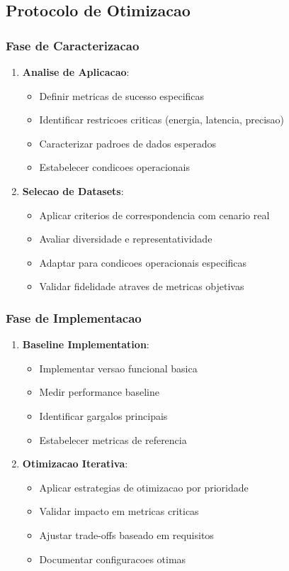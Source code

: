 \subsection{Protocolo de Otimizacao}

\subsubsection{Fase de Caracterizacao}
\begin{enumerate}
    \item \textbf{Analise de Aplicacao}:
    \begin{itemize}
        \item Definir metricas de sucesso especificas
        \item Identificar restricoes criticas (energia, latencia, precisao)
        \item Caracterizar padroes de dados esperados
        \item Estabelecer condicoes operacionais
    \end{itemize}
    
    \item \textbf{Selecao de Datasets}:
    \begin{itemize}
        \item Aplicar criterios de correspondencia com cenario real
        \item Avaliar diversidade e representatividade
        \item Adaptar para condicoes operacionais especificas
        \item Validar fidelidade atraves de metricas objetivas
    \end{itemize}
\end{enumerate}

\subsubsection{Fase de Implementacao}
\begin{enumerate}
    \item \textbf{Baseline Implementation}:
    \begin{itemize}
        \item Implementar versao funcional basica
        \item Medir performance baseline
        \item Identificar gargalos principais
        \item Estabelecer metricas de referencia
    \end{itemize}
    
    \item \textbf{Otimizacao Iterativa}:
    \begin{itemize}
        \item Aplicar estrategias de otimizacao por prioridade
        \item Validar impacto em metricas criticas
        \item Ajustar trade-offs baseado em requisitos
        \item Documentar configuracoes otimas
    \end{itemize}
\end{enumerate}

